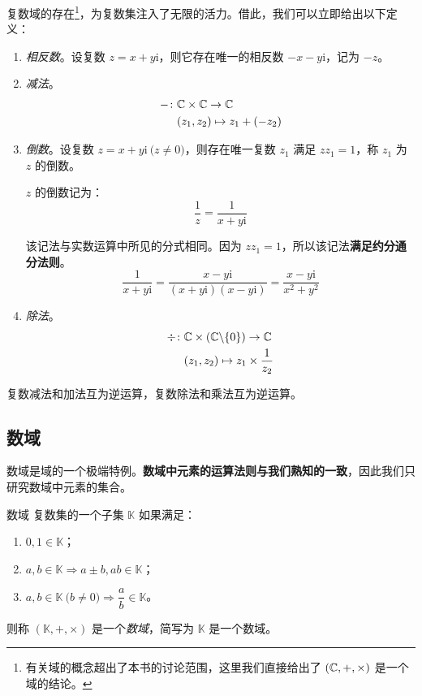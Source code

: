 复数域的存在\footnote{有关域的概念超出了本书的讨论范围，这里我们直接给出了 $(\mathbb C, {+}, {\times})$ 是一个域的结论。}，为复数集注入了无限的活力。借此，我们可以立即给出以下定义：
\begin{enumerate}
	\item \emph{相反数}。设复数 $z = x + y \mathrm i$，则它存在唯一的相反数 $-x - y \mathrm i$，记为 $-z$。
	\item \emph{减法}。
	$$
	\begin{aligned}
		{-} \colon & \mathbb C \times \mathbb C \to \mathbb C
		\\&
		(z_1, z_2) \mapsto z_1 + (-z_2)
	\end{aligned}
	$$
	\item \emph{倒数}。设复数 $z = x + y \mathrm i \pod{z \ne 0}$，则存在唯一复数 $z_1$ 满足 $z z_1 = 1$，称 $z_1$ 为 $z$ 的倒数。

	$z$ 的倒数记为：
	$$
	\dfrac{1}{z} = \dfrac{1}{x + y \mathrm i}
	$$

	该记法与实数运算中所见的分式相同。因为 $z z_1 = 1$，所以该记法\textbf{满足约分通分法则}。
	$$
	\dfrac{1}{x + y \mathrm i} = \dfrac{x - y \mathrm i}{(x + y \mathrm i)(x - y \mathrm i)} = \dfrac{x - y \mathrm i}{x^2 + y^2}
	$$
	\item \emph{除法}。
	$$
	\begin{aligned}
		{\div} \colon & \mathbb C \times (\mathbb C \backslash \{0\}) \to \mathbb C
		\\&
		(z_1, z_2) \mapsto z_1 \times \dfrac{1}{z_2}
	\end{aligned}
	$$
\end{enumerate}

复数减法和加法互为逆运算，复数除法和乘法互为逆运算。

\subsection{数域}

数域是域的一个极端特例。\textbf{数域中元素的运算法则与我们熟知的一致}，因此我们只研究数域中元素的集合。

\begin{definition}{数域}
	复数集的一个子集 $\mathbb K$ 如果满足：
	\begin{enumerate}
		\item $0, 1 \in \mathbb K$；
		\item $a, b \in \mathbb K \Longrightarrow a \pm b, ab \in \mathbb K$；
		\item $a, b \in \mathbb K \pod{b \ne 0} \Longrightarrow \dfrac{a}{b} \in \mathbb K$。
	\end{enumerate}

	则称 $(\mathbb K, {+}, {\times})$ 是一个\emph{数域}，简写为 $\mathbb K$ 是一个数域。
\end{definition}


